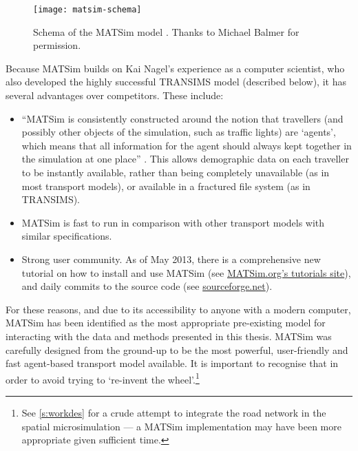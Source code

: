 \begin{figure}[hb] \centerline{
\texttt{[image: matsim-schema]}}
\caption[MATSim schema (permission: Michael Balmer)]{Schema of the MATSim
model \citep{Balmer2009}. Thanks to Michael Balmer for permission.}
\label{fmatsim-schema}
\end{figure}

Because MATSim builds on Kai Nagel's experience as a computer scientist, who
also developed the highly successful TRANSIMS model (described below),
it has several advantages over competitors. These include:
\begin{itemize}
 \item ``MATSim is consistently constructed around the notion that travellers
 (and possibly other objects of the simulation, such as traffic lights) are `agents',
 which means that all information for the agent should always kept together in
 the simulation at one place'' \citep[p.~9]{Balmer2009}. This allows demographic
 data on each traveller to be instantly available, rather than being completely
 unavailable (as in most transport models),
 or available in a fractured file system (as in TRANSIMS).
 \item MATSim is fast to run in comparison with other transport
 models with similar specifications.
 \item Strong user community. As of May 2013, there is a comprehensive
 new tutorial on how to install and use MATSim (see
 \href{http://www.matsim.org/docs/tutorials/}{MATSim.org's tutorials site}),
 and daily commits to the source
 code (see \href{http://sourceforge.net/apps/trac/matsim/timeline}{sourceforge.net}).
\end{itemize}
For these reasons, and due to its accessibility to anyone with a modern computer,
MATSim has been identified as the most appropriate pre-existing model for
interacting with the data and methods presented in this thesis. MATSim
was carefully designed from the ground-up to be the most powerful, user-friendly
and fast agent-based transport model available. It is important to recognise
that in order to avoid trying to `re-invent the
wheel'.\footnote{See \cref{s:workdes}
for a crude attempt to integrate the road network in the spatial microsimulation
--- a MATSim implementation may have been more appropriate given sufficient
time.
}

